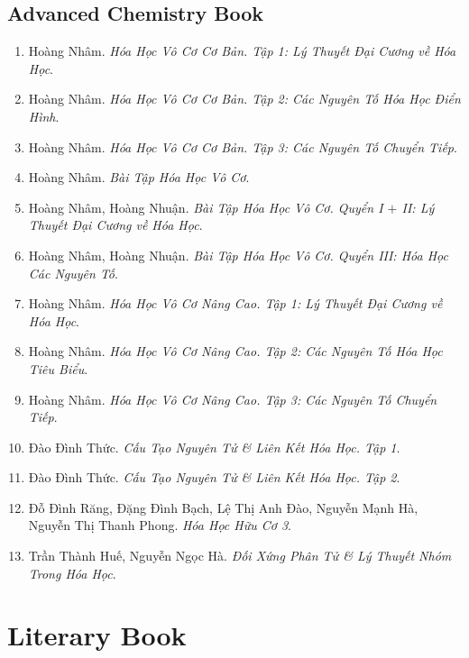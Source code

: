 \documentclass{article}
\begin{document}

\subsection{Advanced Chemistry Book}

\begin{enumerate}
	\item Hoàng Nhâm. \textit{Hóa Học Vô Cơ Cơ Bản. Tập 1: Lý Thuyết Đại Cương về Hóa Học}.
	\item Hoàng Nhâm. \textit{Hóa Học Vô Cơ Cơ Bản. Tập 2: Các Nguyên Tố Hóa Học Điển Hình}.
	\item Hoàng Nhâm. \textit{Hóa Học Vô Cơ Cơ Bản. Tập 3: Các Nguyên Tố Chuyển Tiếp}.
	\item Hoàng Nhâm. \textit{Bài Tập Hóa Học Vô Cơ}.
	\item Hoàng Nhâm, Hoàng Nhuận. \textit{Bài Tập Hóa Học Vô Cơ. Quyển I $+$ II: Lý Thuyết Đại Cương về Hóa Học}.
	\item Hoàng Nhâm, Hoàng Nhuận. \textit{Bài Tập Hóa Học Vô Cơ. Quyển III: Hóa Học Các Nguyên Tố}.
	\item Hoàng Nhâm. \textit{Hóa Học Vô Cơ Nâng Cao. Tập 1: Lý Thuyết Đại Cương về Hóa Học}.
	\item Hoàng Nhâm. \textit{Hóa Học Vô Cơ Nâng Cao. Tập 2: Các Nguyên Tố Hóa Học Tiêu Biểu}.
	\item Hoàng Nhâm. \textit{Hóa Học Vô Cơ Nâng Cao. Tập 3: Các Nguyên Tố Chuyển Tiếp}.
	\item Đào Đình Thức. \textit{Cấu Tạo Nguyên Tử \& Liên Kết Hóa Học. Tập 1}.
	\item Đào Đình Thức. \textit{Cấu Tạo Nguyên Tử \& Liên Kết Hóa Học. Tập 2}.
	\item Đỗ Đình Răng, Đặng Đình Bạch, Lệ Thị Anh Đào, Nguyễn Mạnh Hà, Nguyễn Thị Thanh Phong. \textit{Hóa Học Hữu Cơ 3}.
	\item Trần Thành Huế, Nguyễn Ngọc Hà. \textit{Đối Xứng Phân Tử \& Lý Thuyết Nhóm Trong Hóa Học}.
\end{enumerate}


\section{Literary Book}
\end{document}
